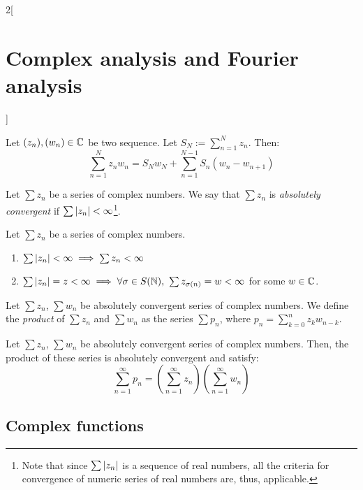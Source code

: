 \documentclass[../../../main.tex]{subfiles}
\begin{document}
\begin{multicols}{2}[\section{Complex analysis and Fourier analysis}]
\begin{proposition}
\begin{enumerate}
    \end{enumerate}
  \end{proposition}
  \begin{lemma}
    Let $(z_n),(w_n)\in\mathbb{C}$ be two sequence. Let $S_N:=\sum_{n=1}^N z_n$. Then:
    \begin{equation*}
      \sum_{n=1}^N z_nw_n=S_Nw_N+\sum_{n=1}^{N-1}S_n(w_n-w_{n+1})
    \end{equation*}
  \end{lemma}
  \begin{definition}
    Let $\sum z_n$ be a series of complex numbers. We say that $\sum z_n$ is \emph{absolutely convergent} if $\sum \abs{z_n}<\infty$\footnote{Note that since $\sum \abs{z_n}$ is a sequence of real numbers, all the criteria for convergence of numeric series of real numbers are, thus, applicable.}.
  \end{definition}
  \begin{proposition}
    Let $\sum z_n$ be a series of complex numbers.
    \begin{enumerate}
      \item $\sum \abs{z_n}<\infty\implies\sum z_n<\infty$
      \item $\sum \abs{z_n}=z<\infty\implies\forall\sigma\in S(\mathbb{N}),\ \sum z_{\sigma (n)}=w<\infty$ for some $w\in\mathbb{C}$.
    \end{enumerate}
  \end{proposition}
  \begin{definition}
    Let $\sum z_n$, $\sum w_n$ be absolutely convergent series of complex numbers. We define the \emph{product} of $\sum z_n$ and $\sum w_n$ as the series $\sum p_n$, where $p_n=\sum_{k=0}^nz_kw_{n-k}$.
  \end{definition}
  \begin{proposition}
    Let $\sum z_n$, $\sum w_n$ be absolutely convergent series of complex numbers. Then, the product of these series is absolutely convergent and satisfy: $$\sum_{n=1}^\infty p_n=\left(\sum_{n=1}^\infty z_n\right)\left(\sum_{n=1}^\infty w_n\right)$$
  \end{proposition}
  \subsection{Complex functions}

\end{multicols}
\end{document}
